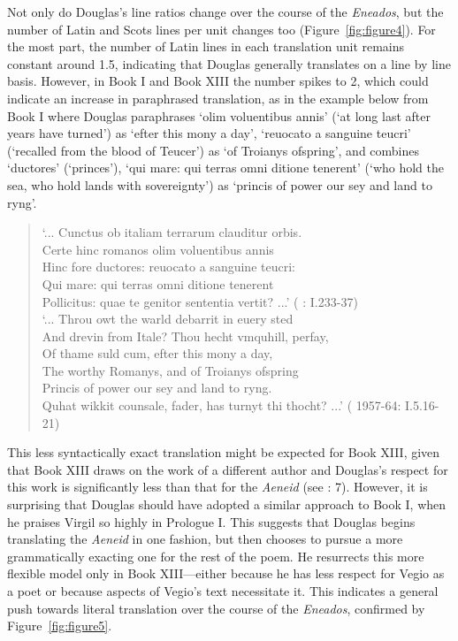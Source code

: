 \documentclass{dhbenelux}
\begin{document}
Not only do Douglas's line ratios change over the course of the
\emph{Eneados}, but the number of Latin and Scots lines per unit changes
too (Figure~\ref{fig:figure4}). For the most part, the number of Latin lines in each
translation unit remains constant around 1.5, indicating that Douglas
generally translates on a line by line basis. However, in Book I and
Book XIII the number spikes to 2, which could indicate an increase in
paraphrased translation, as in the example below from Book I where Douglas
paraphrases `olim voluentibus annis' (`at long last after years have
turned') as `efter this mony a day', `reuocato a sanguine teucri'
(`recalled from the blood of Teucer') as `of Troianys ofspring', and
combines `ductores' (`princes'), `qui mare: qui terras omni ditione
tenerent' (`who hold the sea, who hold lands with sovereignty') as
`princis of power our sey and land to ryng'.

\begin{quote}
`... Cunctus ob italiam terrarum clauditur orbis.\\
Certe hinc romanos olim voluentibus annis\\
Hinc fore ductores: reuocato a sanguine teucri:\\
Qui mare: qui terras omni ditione tenerent\\
Pollicitus: quae te genitor sententia vertit? ...' (\citeauthor{virgil1501} \citeyear{virgil1501}:
I.233-37)\\

`... Throu owt the warld debarrit in euery sted\\
And drevin from Itale? Thou hecht vmquhill, perfay,\\
Of thame suld cum, efter this mony a day,\\
The worthy Romanys, and of Troianys ofspring\\
Princis of power our sey and land to ryng.\\
Quhat wikkit counsale, fader, has turnyt thi thocht? ...' (\citeauthor{douglas1957} 1957-64: I.5.16-21)
\end{quote}

This less syntactically exact translation might be expected for Book
XIII, given that Book XIII draws on the work of a different author
\citep{virgil1501} and Douglas's respect for this work
is significantly less than that for the \emph{Aeneid} (see \citeauthor{ghosh1995} \citeyear{ghosh1995}:
7). However, it is surprising that Douglas should have adopted a similar
approach to Book I, when he praises Virgil so highly in Prologue I. This
suggests that Douglas begins translating the \emph{Aeneid} in one
fashion, but then chooses to pursue a more grammatically exacting one
for the rest of the poem. He resurrects this more flexible model only in
Book XIII---either because he has less respect for Vegio as a poet or
because aspects of Vegio's text necessitate it. This indicates a general
push towards literal translation over the course of the \emph{Eneados},
confirmed by Figure~\ref{fig:figure5}.
\end{document}
